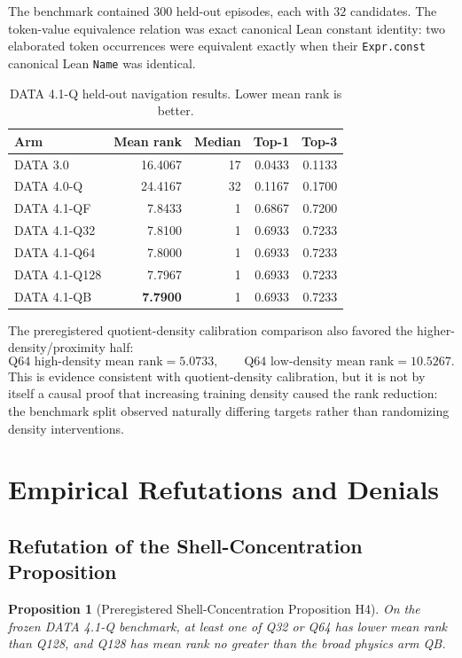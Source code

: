 \documentclass[11pt]{article}
\newtheorem{proposition}[theorem]{Proposition}
\begin{document}
The benchmark contained $300$ held-out episodes, each with $32$ candidates. The token-value equivalence relation was exact canonical Lean constant identity: two elaborated token occurrences were equivalent exactly when their \texttt{Expr.const} canonical Lean \texttt{Name} was identical.

\begin{table}[ht]
\centering
\caption{DATA 4.1-Q held-out navigation results. Lower mean rank is better.}
\begin{tabular}{lrrrr}
\toprule
Arm & Mean rank & Median & Top-1 & Top-3 \\
\midrule
DATA 3.0 & 16.4067 & 17 & 0.0433 & 0.1133 \\
DATA 4.0-Q & 24.4167 & 32 & 0.1167 & 0.1700 \\
DATA 4.1-QF & 7.8433 & 1 & 0.6867 & 0.7200 \\
DATA 4.1-Q32 & 7.8100 & 1 & 0.6933 & 0.7233 \\
DATA 4.1-Q64 & 7.8000 & 1 & 0.6933 & 0.7233 \\
DATA 4.1-Q128 & 7.7967 & 1 & 0.6933 & 0.7233 \\
DATA 4.1-QB & \textbf{7.7900} & 1 & 0.6933 & 0.7233 \\
\bottomrule
\end{tabular}
\end{table}

The preregistered quotient-density calibration comparison also favored the higher-density/proximity half:
\[
\text{Q64 high-density mean rank}=5.0733,
\qquad
\text{Q64 low-density mean rank}=10.5267.
\]
This is evidence consistent with quotient-density calibration, but it is not by itself a causal proof that increasing training density caused the rank reduction: the benchmark split observed naturally differing targets rather than randomizing density interventions.

\section{Empirical Refutations and Denials}

\subsection{Refutation of the Shell-Concentration Proposition}

\begin{proposition}[Preregistered Shell-Concentration Proposition H4]
On the frozen DATA 4.1-Q benchmark, at least one of Q32 or Q64 has lower mean rank than Q128, and Q128 has mean rank no greater than the broad physics arm QB.
\end{proposition}
\end{document}
